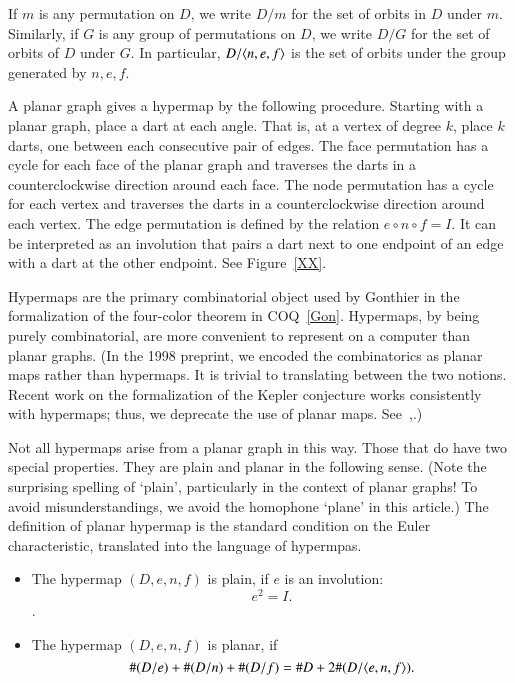 If $m$ is any permutation on $D$, we write $D/m$ for the
set of orbits in $D$ under $m$.  Similarly, if $G$ is any
group of permutations on $D$, we write $D/G$ for the set
of orbits of $D$ under $G$.  In particular, $D/\langle n,e,f\rangle$
is the set of orbits under the group generated by $n,e,f$.

A planar graph gives  a hypermap
by the following procedure.  Starting with a planar graph,
place a dart at each angle.  That is, at a vertex of degree $k$,
place $k$ darts, one between each consecutive pair of edges.
The face permutation has a cycle for
each face of the planar graph and  traverses the
darts in a counterclockwise direction around each face.
The node permutation has a cycle for each vertex and traverses
the darts in a counterclockwise direction around each vertex.
The edge permutation is defined by the relation $e\circ n\circ f=I$.
It can be interpreted as an involution that pairs a dart next
to one endpoint of an edge with a dart at the other endpoint.
See Figure~\ref{XX}.

Hypermaps are the primary combinatorial object used by Gonthier
in the formalization of the four-color theorem in COQ~\ref{Gon}.
Hypermaps, by being purely combinatorial, are more convenient
to represent on a computer than planar graphs.  (In the 1998
preprint, we encoded the combinatorics as planar maps rather
than hypermaps.  It is trivial to translating between the two notions.
Recent work on the formalization of the Kepler conjecture works
consistently with hypermaps; thus, we deprecate the use of
planar maps.  See~\cite{XXObua},\cite{XXBlue}.)

Not all hypermaps arise from a planar graph in this way.
Those that do have two special properties.  They are plain
and planar in the following sense.  (Note the surprising spelling
of `plain', particularly in the context of planar graphs!  
To avoid misunderstandings, 
we avoid the homophone `plane' in this article.)  The definition
of planar hypermap is the standard condition on the Euler
characteristic, translated into the language of hypermpas.

\begin{definition}\label{def:plain}

\begin{itemize}
\item The hypermap $(D,e,n,f)$ is plain, if $e$ is an involution:
$$
 e^2 = I.
$$.
\item The hypermap $(D,e,n,f)$ is planar, if
   $$
   \#(D/e) + \#(D/n) + \#(D/f) = \# D + 2\#(D/\langle e,n,f\rangle).
   $$
\end{itemize}
\end{definition}

